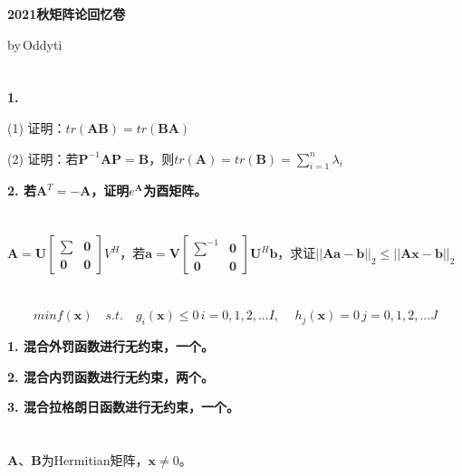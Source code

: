 \documentclass{../source/Paper}
\date{\today}
\begin{document}
    \begin{center}
        \bfseries\huge{2021秋矩阵论回忆卷}


        \large{by\,Oddyti}
    \end{center}
    \section{}
        \bfseries{1.}

        (1) 证明：$tr(\boldsymbol{AB}) = tr(\boldsymbol{BA})$
        
        (2) 证明：若$\boldsymbol P^{-1} \boldsymbol A \boldsymbol P =  \boldsymbol B$，则$tr(\boldsymbol{A}) = tr(\boldsymbol{B}) = \sum \nolimits_{i = 1}^n \lambda_i$

        \bfseries{2.}
        若$\boldsymbol A^T = - \boldsymbol A$，证明$e^{\boldsymbol A}$为酉矩阵。
    \section{}
        $\boldsymbol A = \boldsymbol U \begin{bmatrix}
            \boldsymbol {\sum} & \boldsymbol 0 \\ \boldsymbol 0 &  \boldsymbol 0
        \end{bmatrix}V^H$，若$\boldsymbol a = \boldsymbol V \begin{bmatrix}
            \boldsymbol {\sum}^{-1} & \boldsymbol 0 \\ \boldsymbol 0 &  \boldsymbol 0
        \end{bmatrix}\boldsymbol U^H\boldsymbol b$，求证$||\boldsymbol A \boldsymbol a - \boldsymbol b||_2 \leq ||\boldsymbol A \boldsymbol x - \boldsymbol b||_2 $
    \section{}
        $$min f({\boldsymbol x}) \quad s.t. \quad g_i(\boldsymbol x) \leq 0 \, i = 0,1,2,...I ,\, \quad h_j(\boldsymbol x) = 0 \, j = 0,1,2,...J$$

        \bfseries{1.} 混合外罚函数进行无约束，一个。

        \bfseries{2.} 混合内罚函数进行无约束，两个。

        \bfseries{3.} 混合拉格朗日函数进行无约束，一个。

    \section{}
        $\boldsymbol A$、$\boldsymbol B$为Hermitian矩阵，$\boldsymbol x \neq 0$。 
\end{document}
